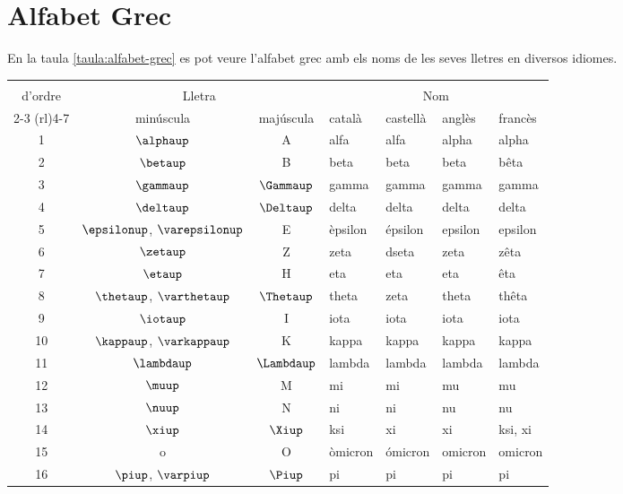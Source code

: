 \chapter{Alfabet Grec} \label{sec:alf-grec}

 En la taula \vref{taula:alfabet-grec} es pot veure l'alfabet grec
 amb els noms de les seves lletres en diversos idiomes.

\begin{center}
    \label{taula:alfabet-grec}
   \begin{tabular}{cccllll}
   \toprule[1pt]
   \renewcommand*{\multirowsetup}{\centering}
   \multirow{2}{15mm}{\rule{0mm}{4.5mm}Número\\d'ordre} & \multicolumn{2}{c}{Lletra} &
   \multicolumn{4}{c}{Nom} \\
   \cmidrule(rl){2-3} \cmidrule(rl){4-7}
    & minúscula & majúscula & català & castellà &  anglès & francès\\
   \midrule
   1  & $\alphaup$ & A & alfa & alfa &  alpha & alpha\\
   2  & $\betaup$ & B & beta & beta &  beta & bêta\\
   3  & $\gammaup$ & $\Gammaup$ & gamma & gamma &  gamma & gamma\\
   4  & $\deltaup$ & $\Deltaup$ & delta & delta &  delta & delta\\
   5  & $\epsilonup$, $\varepsilonup$ & E & èpsilon & épsilon &  epsilon & epsilon\\
   6  & $\zetaup$ & Z & zeta & dseta &  zeta & zêta\\
   7  & $\etaup$ & H & eta & eta &  eta & êta\\
   8  & $\thetaup$, $\varthetaup$ & $\Thetaup$ & theta & zeta &  theta & thêta\\
   9  & $\iotaup$ & I & iota & iota &  iota & iota\\
   10 & $\kappaup$, $\varkappaup$ & K & kappa & kappa &  kappa & kappa\\
   11 & $\lambdaup$ & $\Lambdaup$ & lambda & lambda &  lambda &lambda\\
   12 & $\muup$ & M & mi & mi &  mu & mu\\
   13 & $\nuup$ & N & ni & ni &  nu & nu\\
   14 & $\xiup$ & $\Xiup$ & ksi & xi &  xi & ksi, xi\\
   15 & o & O & òmicron & ómicron &  omicron & omicron\\
   16 & $\piup$, $\varpiup$ & $\Piup$ & pi & pi &  pi & pi\\

\end{tabular}
\end{center}
